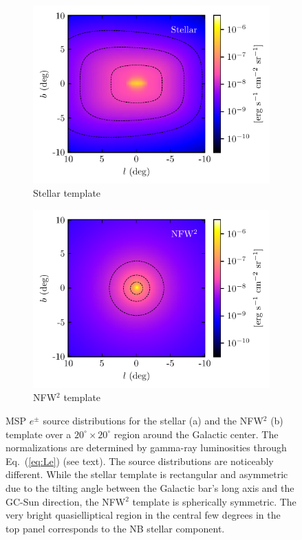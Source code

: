 \documentclass[doublespace,nopageskip]{VTthesis} %
\begin{document}
\begin{figure}[htb]
	\centering
	\begin{subfigure}[h]{0.45\textwidth}
		\centering
		\includegraphics[width=\textwidth]{Figures/IC_MSPs/injection_skymap_bulge.pdf}
		\caption{Stellar template}
		\label{fig:injection_skymap_bulge}
	\end{subfigure}
	\begin{subfigure}[h]{0.45\textwidth}
		\centering
		\includegraphics[width=\textwidth]{Figures/IC_MSPs/injection_skymap_nfw.pdf}
		\caption{NFW$^2$ template}
		\label{fig:njection_skymap_nfw}
	\end{subfigure}
	\caption{MSP $e^\pm$ source distributions for the stellar (a) and the NFW$^2$ (b) template over a $20^\circ \times 20^\circ$ region around the Galactic center. The normalizations are determined by gamma-ray luminosities through Eq.~(\ref{eq:Le}) (see text). The source distributions are noticeably different. While the stellar template is rectangular and asymmetric due to the tilting angle between the Galactic bar's long axis and the GC-Sun direction, the NFW$^2$ template is spherically symmetric. The very bright quasielliptical region in the central few degrees in the top panel corresponds to the NB stellar component.}
	\label{fig:injection_skymap}
\end{figure}
\end{document}
